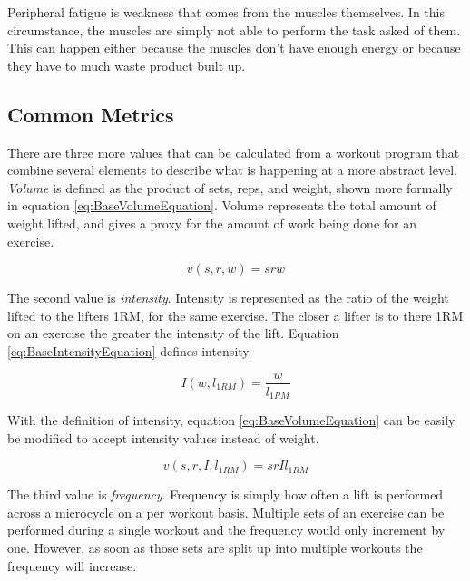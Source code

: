 Peripheral fatigue is weakness that comes from the muscles themselves. In this circumstance, the muscles are simply not able to perform the task asked of them. This can happen either because the muscles don't have enough energy or because they have to much waste product built up. \cite{MEASURING_FATIGUE}

\subsection{Common Metrics}
\label{sec:CommonMetrics}

There are three more values that can be calculated from a workout program that combine several elements to describe what is happening at a more abstract level. \textit{Volume} is defined as the product of sets, reps, and weight, shown more formally in equation \ref{eq:BaseVolumeEquation}. Volume represents the total amount of weight lifted, and gives a proxy for the amount of work being done for an exercise.

\begin{equation}
    \label{eq:BaseVolumeEquation}
    v(s,r,w)=srw
\end{equation}

The second value is \textit{intensity}. Intensity is represented as the ratio of the weight lifted to the lifters 1RM, for the same exercise. The closer a lifter is to there 1RM on an exercise the greater the intensity of the lift. Equation \ref{eq:BaseIntensityEquation} defines intensity.

\begin{equation}
    \label{eq:BaseIntensityEquation}
    I(w,l_{1RM})=\frac{w}{l_{1RM}}
\end{equation}

With the definition of intensity, equation \ref{eq:BaseVolumeEquation} can be easily be modified to accept intensity values instead of weight.

\begin{equation}
    \label{eq:IntensityBasedVolumeEquation}
    v(s,r,I,l_{1RM})=srIl_{1RM}
\end{equation}

The third value is \textit{frequency}. Frequency is simply how often a lift is performed across a microcycle on a per workout basis. Multiple sets of an exercise can be performed during a single workout and the frequency would only increment by one. However, as soon as those sets are split up into multiple workouts the frequency will increase. 



